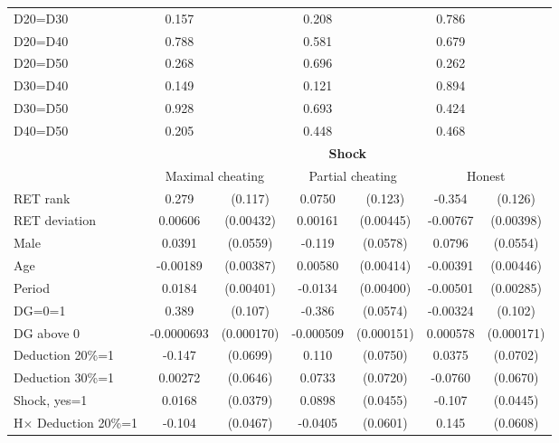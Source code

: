 \begin{tabular}{lcccccc}
D20=D30         &    0.157         &         &    0.208         &         &    0.786         &         \\
D20=D40         &    0.788         &         &    0.581         &         &    0.679         &         \\
D20=D50         &    0.268         &         &    0.696         &         &    0.262         &         \\
D30=D40         &    0.149         &         &    0.121         &         &    0.894         &         \\
D30=D50         &    0.928         &         &    0.693         &         &    0.424         &         \\
D40=D50         &    0.205         &         &    0.448         &         &    0.468         &         \\
\hline\hline
&\multicolumn{6}{c}{\bf Shock}\\
                &\multicolumn{2}{c}{Maximal cheating}&\multicolumn{2}{c}{Partial cheating}&\multicolumn{2}{c}{Honest}  \\
\hline
RET rank        &    0.279\sym{**} &  (0.117)&   0.0750         &  (0.123)&   -0.354\sym{***}&  (0.126)\\
RET deviation   &  0.00606         &(0.00432)&  0.00161         &(0.00445)& -0.00767\sym{*}  &(0.00398)\\
Male            &   0.0391         & (0.0559)&   -0.119\sym{**} & (0.0578)&   0.0796         & (0.0554)\\
Age             & -0.00189         &(0.00387)&  0.00580         &(0.00414)& -0.00391         &(0.00446)\\
Period          &   0.0184\sym{***}&(0.00401)&  -0.0134\sym{***}&(0.00400)& -0.00501\sym{*}  &(0.00285)\\
DG=0=1          &    0.389\sym{***}&  (0.107)&   -0.386\sym{***}& (0.0574)& -0.00324         &  (0.102)\\
DG above 0      &-0.0000693         &(0.000170)&-0.000509\sym{***}&(0.000151)& 0.000578\sym{***}&(0.000171)\\
Deduction 20\%=1&   -0.147\sym{**} & (0.0699)&    0.110         & (0.0750)&   0.0375         & (0.0702)\\
Deduction 30\%=1&  0.00272         & (0.0646)&   0.0733         & (0.0720)&  -0.0760         & (0.0670)\\
Shock, yes=1    &   0.0168         & (0.0379)&   0.0898\sym{**} & (0.0455)&   -0.107\sym{**} & (0.0445)\\
H$\times$ Deduction 20\%=1&   -0.104\sym{**} & (0.0467)&  -0.0405         & (0.0601)&    0.145\sym{**} & (0.0608)\\

\end{tabular}

